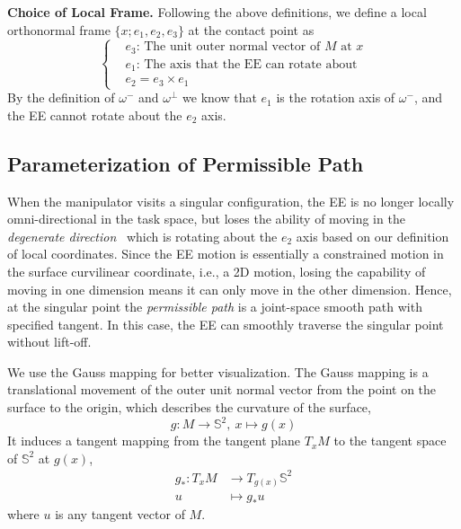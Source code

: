 \documentclass[Afour,sageh,times]{sagej}
\begin{document}
\textbf{Choice of Local Frame. }
Following the above definitions, we define a local orthonormal frame $\{x; e_1, e_2, e_3\}$ at the contact point as 
\begin{equation}
\left\{
\begin{aligned}
&e_3\mbox{: The unit outer normal vector of $M$ at $x$}\\ 
&e_1\mbox{: The axis that the EE can rotate about}\\ 
&e_2 = e_3\times e_1
\end{aligned}
\right.
\end{equation}
By the definition of $\omega^-$ and $\omega^\perp$ we know that $e_1$ is the rotation axis of $\omega^-$, and the EE cannot rotate about the $e_2$ axis. 

\subsection{Parameterization of Permissible Path}\label{subsection_parameterization}
When the manipulator visits a singular configuration, the EE is no longer locally omni-directional in the task space, but loses the ability of moving in the \textit{degenerate direction}~\cite{Egeland1991Manipulator} which is rotating about the $e_2$ axis based on our definition of local coordinates. 
Since the EE motion is essentially a constrained motion in the surface curvilinear coordinate, i.e., a 2D motion, losing the capability of moving in one dimension means it can only move in the other dimension. 
Hence, at the singular point the \textit{permissible path} is a joint-space smooth path with specified tangent.
In this case, the EE can smoothly traverse the singular point without lift-off. 

We use the Gauss mapping for better visualization. 
The Gauss mapping is a translational movement of the outer unit normal vector from the point on the surface to the origin, which describes the curvature of the surface,
\begin{equation}
g: M\rightarrow \mathbb{S}^2,\ x\mapsto g(x)
\end{equation}
It induces a tangent mapping from the tangent plane $T_xM$ to the tangent space of $\mathbb{S}^2$ at $g(x)$,
\begin{equation}
\begin{aligned}
g_*: T_xM&\rightarrow T_{g(x)}\mathbb{S}^2\\
u&\mapsto g_*u
\end{aligned}
\end{equation}
where $u$ is any tangent vector of $M$. 
\end{document}
